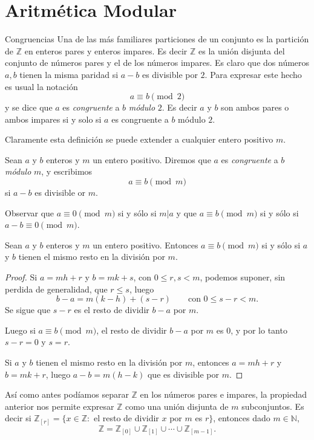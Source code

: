 
\chapter[Aritmética Modular]{Aritmética Modular}



\begin{section}{Congruencias}
Una de las más familiares particiones de un conjunto es la
partición de $\mathbb Z$ en enteros pares y enteros impares. Es
decir $\mathbb Z$ es la unión disjunta del conjunto de números
pares y el de los números impares. Es claro que dos números
$a,b$ tienen la misma paridad si $a-b$ es divisible por $2$.
Para expresar este hecho es usual la notación
$$
a\equiv b \pmod2
$$
y se dice que $a$ es {\it congruente } a $b$ {\it módulo} $2$.
Es decir $a$ y $b$ son ambos pares o ambos impares si y solo
si $a$ es congruente a $b$ módulo $2$.

Claramente esta definición se puede extender a cualquier entero
positivo $m$.

\begin{definicion} Sean $a$ y $b$ enteros y $m$ un
entero positivo. Diremos que $a$ es {\em congruente} a $b$
 {\em módulo} $m$, y escribimos  
$$
a \equiv b \pmod{m}
$$
si $a-b$ es divisible or $m$.
\end{definicion}

Observar que $a\equiv 0 \pmod{m}$ si  y sólo si $m|a$ y que $a\equiv b \pmod{m}$ si y sólo si $a-b\equiv 0 \pmod{m}$. 


\begin{proposicion}
Sean $a$ y $b$ enteros y $m$ un entero positivo. Entonces $a\equiv b \pmod{m}$ si  y sólo si
$a$ y $b$ tienen el mismo resto en la división por $m$.
\end{proposicion}
\begin{proof}
Si $a=mh+r$ y $b=mk+s$, con $0 \le r,s <m$, podemos suponer,
sin perdida de generalidad, que $r \le s$, luego
$$
b-a= m(k-h) + (s-r) \qquad \text{con $0\le s - r < m$}.
$$
Se sigue que $s-r$ es el resto de dividir $b-a$ por $m$.

Luego si $a\equiv b \pmod{m}$, el resto de dividir   $b-a$ por $m$ es 0, y por lo tanto $s-r=0$ y $s=r$.

Si $a$ y $b$ tienen el mismo resto en la división por $m$, entonces  $a=mh+r$ y $b=mk+r$, luego $a-b = m(h-k)$ que es divisible por $m$.
\end{proof}

Así como antes podíamos separar $\mathbb Z$ en los números pares e
impares, la propiedad anterior nos permite expresar $\mathbb Z$
como una unión disjunta de $m$ subconjuntos. Es decir si $\mathbb  Z_{[r]}
=\{x \in \mathbb Z:$ el resto de dividir $x$ por $m$ es $r\}$,
entonces dado $m \in \mathbb N$, 
$$
\mathbb Z= \mathbb Z_{[0]}\cup \mathbb Z_{[1]}\cup \cdots\cup \mathbb Z_{[m-1]}.
$$




\end{section}
